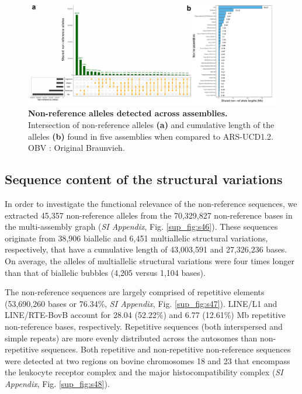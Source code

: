 \documentclass[../main.tex]{subfiles}
\begin{document}
\begin{landscape}
    \begin{figure}[!htb]
        \centering
        \includegraphics[width=1.5\textwidth]{paper3/main_figure/Fig2.pdf}
            \caption[Non-reference alleles detected across assemblies]{\textbf{Non-reference alleles detected across assemblies.} \\
            \footnotesize{Intersection of non-reference alleles \textbf{(a)} and cumulative length of the alleles \textbf{(b)} found in five assemblies when compared to ARS-UCD1.2. OBV : Original Braunvieh.}}
            \label{fig42:nrfsec}
    \end{figure}  
\end{landscape}


\subsection*{Sequence content of the structural variations}

In order to investigate the functional relevance of the non-reference sequences, we extracted 45,357 non-reference alleles from the 70,329,827 non-reference bases in the multi-assembly graph (\emph{SI Appendix}, Fig. \ref{sup_fig:s46}). These sequences originate from 38,906 biallelic and 6,451 multiallelic structural variations, respectively, that have a cumulative length of 43,003,591 and 27,326,236 bases. On average, the alleles of multiallelic structural variations were four times longer than that of biallelic bubbles (4,205 versus 1,104 bases). 
 
The non-reference sequences are largely comprised of repetitive elements (53,690,260 bases or 76.34\%, \emph{SI Appendix}, Fig. \ref{sup_fig:s47}). LINE/L1 and LINE/RTE-BovB account for 28.04 (52.22\%) and 6.77 (12.61\%) Mb repetitive non-reference bases, respectively. Repetitive sequences (both interspersed and simple repeats) are more evenly distributed across the autosomes than non-repetitive sequences. Both repetitive and non-repetitive non-reference sequences were detected at two regions on bovine chromosomes 18 and 23 that encompass the leukocyte receptor complex and the major histocompatibility complex (\emph{SI Appendix}, Fig. \ref{sup_fig:s48}). 
\end{document}
